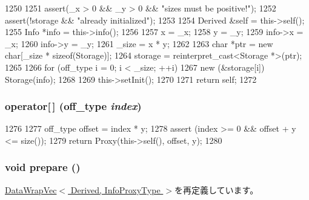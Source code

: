 \begin{DoxyCode}
1250     {
1251         assert(_x > 0 && _y > 0 && "sizes must be positive!");
1252         assert(!storage && "already initialized");
1253 
1254         Derived &self = this->self();
1255         Info *info = this->info();
1256 
1257         x = _x;
1258         y = _y;
1259         info->x = _x;
1260         info->y = _y;
1261         _size = x * y;
1262 
1263         char *ptr = new char[_size * sizeof(Storage)];
1264         storage = reinterpret_cast<Storage *>(ptr);
1265 
1266         for (off_type i = 0; i < _size; ++i)
1267             new (&storage[i]) Storage(info);
1268 
1269         this->setInit();
1270 
1271         return self;
1272     }
\end{DoxyCode}
\hypertarget{classStats_1_1Vector2dBase_ad22583203a39f3bb11549cc89ba71e9d}{
\subsubsection[{operator[]}]{ operator\mbox{[}$\,$\mbox{]} ({\bf off\_\-type} {\em index})}}
\label{classStats_1_1Vector2dBase_ad22583203a39f3bb11549cc89ba71e9d}



\begin{DoxyCode}
1276     {
1277         off_type offset = index * y;
1278         assert (index >= 0 && offset + y <= size());
1279         return Proxy(this->self(), offset, y);
1280     }
\end{DoxyCode}
\hypertarget{classStats_1_1Vector2dBase_a1825b40ca3bc3a1ba67fdb58fac5015c}{
\subsubsection[{prepare}]{\setlength{\rightskip}{0pt plus 5cm}void prepare ()}}
\label{classStats_1_1Vector2dBase_a1825b40ca3bc3a1ba67fdb58fac5015c}


\hyperlink{classStats_1_1DataWrapVec_a1825b40ca3bc3a1ba67fdb58fac5015c}{DataWrapVec$<$ Derived, InfoProxyType $>$}を再定義しています。


